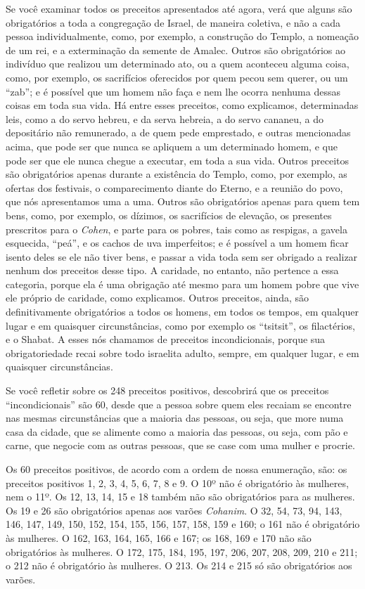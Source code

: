 Se você examinar todos os preceitos apresentados até agora, verá que
alguns são obrigatórios a toda a congregação de Israel, de maneira
coletiva, e não a cada pessoa individualmente, como, por exemplo, a
construção do Templo, a nomeação de um rei, e a exterminação da semente
de Amalec. Outros são obrigatórios ao indivíduo que realizou um
determinado ato, ou a quem aconteceu alguma coisa, como, por exemplo,
os sacrifícios oferecidos por quem pecou sem querer, ou um ``zab''; e é
possível que um homem não faça e nem lhe ocorra nenhuma dessas coisas em
toda sua vida. Há entre esses preceitos, como explicamos, determinadas
leis, como a do servo hebreu, e da serva hebreia, a do servo cananeu, a
do depositário não remunerado, a de quem pede emprestado, e outras
mencionadas acima, que pode ser que nunca se apliquem a um determinado
homem, e que pode ser que ele nunca chegue a executar, em toda a sua
vida. Outros preceitos são obrigatórios apenas durante a existência do
Templo, como, por exemplo, as ofertas dos festivais, o comparecimento
diante do Eterno, e a reunião do povo, que nós apresentamos uma a uma.
Outros são obrigatórios apenas para quem tem bens, como, por exemplo,
os dízimos, os sacrifícios de elevação, os presentes prescritos para o
\textit{Cohen}, e parte para os pobres, tais como as respigas, a gavela
esquecida, ``peá'', e os cachos de uva imperfeitos; e é possível a um
homem ficar isento deles se ele não tiver bens, e passar a vida toda sem
ser obrigado a realizar nenhum dos preceitos desse tipo. A caridade, no
entanto, não pertence a essa categoria, porque ela é uma obrigação até
mesmo para um homem pobre que vive ele próprio de caridade, como
explicamos. Outros preceitos, ainda, são definitivamente obrigatórios a todos os homens, em todos os tempos, em qualquer lugar e em
quaisquer circunstâncias, como por exemplo os ``tsitsit'', os
filactérios, e o Shabat. A esses nós chamamos de preceitos
incondicionais, porque sua obrigatoriedade recai sobre todo israelita
adulto, sempre, em qualquer lugar, e em quaisquer circunstâncias.

Se você refletir sobre os 248 preceitos positivos, descobrirá que os
preceitos ``incondicionais'' são 60, desde que a pessoa sobre quem eles
recaiam se encontre nas mesmas circunstâncias que a maioria das pessoas,
ou seja, que more numa casa da cidade, que se alimente como a maioria
das pessoas, ou seja, com pão e carne, que negocie com as outras
pessoas, que se case com uma mulher e procrie.

Os 60 preceitos positivos, de acordo com a ordem de nossa enumeração,
são: os preceitos positivos 1, 2, 3, 4, 5, 6, 7, 8 e 9. O 10º não é
obrigatório às mulheres, nem o 11º. Os 12, 13, 14, 15 e 18 também não
são obrigatórios para as mulheres. Os 19 e 26 são obrigatórios apenas
aos varões \textit{Cohanim}. O 32, 54, 73, 94, 143, 146, 147, 149, 150, 152,
154, 155, 156, 157, 158, 159 e 160; o 161 não é obrigatório às mulheres.
O 162, 163, 164, 165, 166 e 167; os 168, 169 e 170 não são obrigatórios
às mulheres. O 172, 175, 184, 195, 197, 206, 207, 208, 209, 210 e 211; o
212 não é obrigatório às mulheres. O 213. Os 214 e 215 só são
obrigatórios aos varões.

